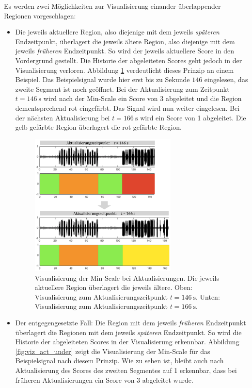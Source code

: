 Es werden zwei Möglichkeiten zur Visualisierung einander überlappender Regionen vorgeschlagen:

\begin{itemize}
\item Die jeweils \glqq aktuellere\grqq{} Region, also diejenige mit dem jeweils \emph{späteren} Endzeitpunkt, überlagert die jeweils \glqq ältere\grqq{} Region, also diejenige mit dem jeweils \emph{früheren} Endzeitpunkt. So wird der jeweils aktuellere Score in den Vordergrund gestellt. Die Historie der abgeleiteten Scores geht jedoch in der Visualisierung verloren. Abbildung \ref{fig:viz_act_over} verdeutlicht dieses Prinzip an einem Beispiel. Das Beispielsignal wurde hier erst bis zu Sekunde $146$ eingelesen, das zweite Segment ist noch geöffnet. Bei der Aktualisierung zum Zeitpunkt $t=\SI{146}{\second}$ wird nach der Min-Scale ein Score von 3 abgeleitet und die Region dementsprechend rot eingefärbt. Das Signal wird nun weiter eingelesen. Bei der nächsten Aktualisierung bei $t=\SI{166}{\second}$ wird ein Score von 1 abgeleitet. Die gelb gefärbte Region überlagert die rot gefärbte Region.

\begin{figure}[h]
	\centering
	\includegraphics[width=0.7\textwidth]{bilder/viz_act_over_02.png}
	\caption{Visualisierung der Min-Scale bei Aktualisierungen. Die jeweils \glqq aktuellere\grqq{} Region überlagert die jeweils \glqq ältere\grqq{}. Oben: Visualisierung zum Aktualisierungszeitpunkt $t=\SI{146}{\second}$. Unten: Visualisierung zum Aktualisierungszeitpunkt $t=\SI{166}{\second}$.}
	\label{fig:viz_act_over}
\end{figure}

\item Der entgegengesetzte Fall: Die Region mit dem jeweils \emph{früheren} Endzeitpunkt überlagert die Regionen mit dem jeweils \emph{späteren} Endzeitpunkt. So wird die Historie der abgeleiteten Scores in der Visualisierung erkennbar. Abbildung \ref{fig:viz_act_under} zeigt die Visualisierung der Min-Scale für das Beispielsignal nach diesem Prinzip. Wie zu sehen ist, bleibt auch nach Aktualisierung des Scores des zweiten Segmentes auf 1 erkennbar, dass bei früheren Aktualisierungen ein Score von 3 abgeleitet wurde.


\end{itemize}
